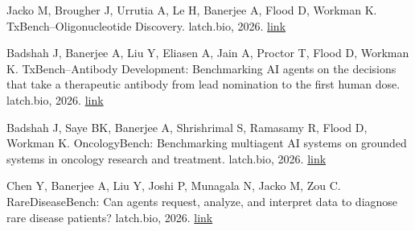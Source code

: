 \begin{references}
\item Jacko M, Brougher J, Urrutia A, Le H, Banerjee A, Flood D, Workman K. TxBench--Oligonucleotide Discovery. latch.bio, 2026. \href{https://latch.bio/txbench-oligo}{link}
\item Badshah J, Banerjee A, Liu Y, Eliasen A, Jain A, Proctor T, Flood D, Workman K. TxBench--Antibody Development: Benchmarking AI agents on the decisions that take a therapeutic antibody from lead nomination to the first human dose. latch.bio, 2026. \href{https://latch.bio/txbench-ab-dev}{link}
\item Badshah J, Saye BK, Banerjee A, Shrishrimal S, Ramasamy R, Flood D, Workman K. OncologyBench: Benchmarking multiagent AI systems on grounded systems in oncology research and treatment. latch.bio, 2026. \href{https://latch.bio/oncologybench}{link}
\item Chen Y, Banerjee A, Liu Y, Joshi P, Munagala N, Jacko M, Zou C. RareDiseaseBench: Can agents request, analyze, and interpret data to diagnose rare disease patients? latch.bio, 2026. \href{https://latch.bio/rarediseasebench}{link}
\end{references}
